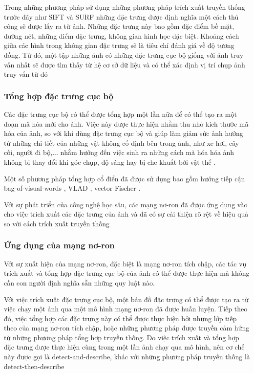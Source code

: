 Trong những phương pháp sử dụng những phương pháp trích xuất truyền thống trước đây như SIFT \cite{lowe2004distinctive} và SURF \cite{bay2006surf} những đặc trưng được định nghĩa một cách thủ công sẽ được lấy ra từ ảnh. Những đặc trưng này bao gồm đặc điểm bề mặt, đường nét, những điểm đặc trưng, không gian hình học đặc biệt. Khoảng cách giữa các hình trong không gian đặc trưng sẽ là tiêu chí đánh giá về độ tương đồng. Từ đó, một tập những ảnh có những đặc trưng cục bộ giống với ảnh truy vấn nhất sẽ được tìm thấy từ hệ cơ sở dữ liệu và có thể xác định vị trí chụp ảnh truy vấn từ đó \cite{pion2020benchmarking}
\subsubsection*{Tổng hợp đặc trưng cục bộ}
Các đặc trưng cục bộ có thể được tổng hợp một lần nữa để có thể tạo ra một đoạn mã hóa mới cho ảnh. Việc này được thực hiện nhằm thu nhỏ kích thước mã hóa của ảnh, so với khi dùng đặc trưng cục bộ và giúp làm giảm sức ảnh hưởng từ những chi tiết của những vật không cố định bên trong ảnh, như xe hơi, cây cối, người đi bộ,... nhằm hướng đến việc sinh ra những cách mã hóa hóa ảnh không bị thay đổi khi góc chụp, độ sáng hay bị che khuất bởi vật thể \cite{jegou2010aggregating}.

Một số phương pháp tổng hợp cổ điển đã được sử dụng bao gồm hướng tiếp cận bag-of-visual-words \cite{philbin2007object}, VLAD \cite{jegou2010aggregating}, vector Fischer \cite{jegou2011aggregating}.

Với sự phát triển của công nghệ học sâu, các mạng nơ-ron đã được ứng dụng vào cho việc trích xuất các đặc trưng của ảnh và đã có sự cải thiện rõ rệt về hiệu quả \cite{sunderhauf2015performance} so với cách trích xuất truyền thống
\subsubsection*{Ứng dụng của mạng nơ-ron}

Với sự xuất hiện của mạng nơ-ron, đặc biệt là mạng nơ-ron tích chập, các tác vụ trích xuất và tổng hợp đặc trưng cục bộ của ảnh có thể được thực hiện mà không cần con người định nghĩa sẵn những quy luật nào.

Với việc trích xuất đặc trưng cục bộ, một bản đồ đặc trưng có thể được tạo ra từ việc chạy một ảnh qua một mô hình mạng nơ-ron đã được huấn luyện. Tiếp theo đó, việc tổng hợp các đặc trưng này có thể được thực hiện bởi những lớp tiếp theo của mạng nơ-ron tích chập, hoặc những phương pháp được truyền cảm hứng từ những phương pháp tổng hợp truyền thống. Do việc trích xuất và tổng hợp đặc trưng được thực hiện cùng trong một lần ảnh chạy qua mô hình, nên cơ chế này được gọi là detect-and-describe, khác với những phương pháp truyền thống là detect-then-describe \cite{9373578}

